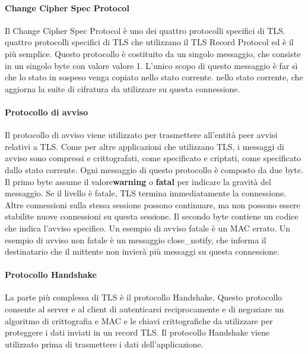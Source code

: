 \singlespacing

\paragraph{Change Cipher Spec Protocol} Il Change Cipher Spec Protocol è uno dei quattro protocolli specifici di TLS.
quattro protocolli specifici di TLS che utilizzano il TLS Record Protocol ed è il più semplice. Questo protocollo è costituito da un singolo messaggio, che consiste in un singolo byte con valore valore 1. L'unico scopo di questo messaggio è far sì che lo stato in sospeso venga copiato nello stato corrente. nello stato corrente, che aggiorna la suite di cifratura da utilizzare su questa connessione. 

\singlespacing

\paragraph{Protocollo di avviso} Il protocollo di avviso viene utilizzato per trasmettere all'entità peer avvisi relativi a TLS. Come per altre applicazioni che utilizzano TLS, i messaggi di avviso sono compressi e crittografati, come specificato e criptati, come specificato dallo stato corrente. Ogni messaggio di questo protocollo è composto da due byte. Il primo byte assume il valore\textbf{warning} o \textbf{fatal} per indicare la gravità del messaggio. Se il livello è fatale, TLS termina immediatamente la connessione. Altre connessioni sulla stessa sessione possono continuare, ma non possono essere stabilite nuove connessioni su questa sessione. Il secondo byte contiene un codice che indica l'avviso specifico. Un esempio di avviso fatale è un MAC errato. Un esempio di avviso non fatale è un messaggio close\_notify, che informa il destinatario che il mittente non invierà più messaggi su questa connessione.

\singlespacing

\paragraph{Protocollo Handshake} La parte più complessa di TLS è il protocollo Handshake. Questo protocollo consente al server e al client di autenticarsi reciprocamente e di negoziare un algoritmo di crittografia e MAC e le chiavi crittografiche da utilizzare per proteggere i dati inviati in un record TLS. Il protocollo Handshake viene utilizzato prima di trasmettere i dati dell'applicazione.

